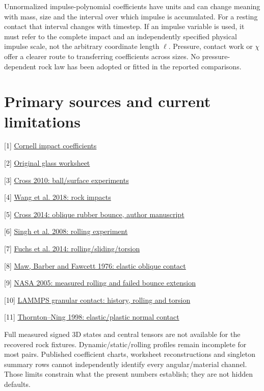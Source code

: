 \documentclass[10pt,a4paper]{article}
\begin{document}
Unnormalized impulse-polynomial coefficients have units and can change meaning
with mass, size and the interval over which impulse is accumulated. For a resting
contact that interval changes with timestep. If an impulse variable is used, it must
refer to the complete impact and an independently specified physical impulse scale,
not the arbitrary coordinate length $\ell$. Pressure, contact work or $\chi$ offer
a clearer route to transferring coefficients across sizes. No pressure-dependent
rock law has been adopted or fitted in the reported comparisons.

\newpage
\section*{Primary sources and current limitations}
[1] \href{https://grainflowresearch.mae.cornell.edu/impact/data/Impact%20Results.html}{Cornell impact coefficients}

[2] \href{https://grainflowresearch.mae.cornell.edu/impact/data/Results-3mmglass-binary}{Original glass worksheet}

[3] \href{https://www.physics.usyd.edu.au/~cross/PUBLICATIONS/48.%20EnhanceBounce.pdf}{Cross 2010: ball/surface experiments}

[4] \href{https://doi.org/10.5194/nhess-18-3045-2018}{Wang et al. 2018: rock impacts}

[5] \href{https://www.researchgate.net/publication/278104773_Oblique_Bounce_of_a_Rubber_Ball}{Cross 2014: oblique rubber bounce, author manuscript}

[6] \href{https://arxiv.org/abs/0809.4823}{Singh et al. 2008: rolling experiment}

[7] \href{https://www2.msm.ctw.utwente.nl/sluding/PAPERS/2014_WeinhartFuchs_GMr.pdf}{Fuchs et al. 2014: rolling/sliding/torsion}

[8] \href{https://websites.umich.edu/~jbarber/Wear1976.pdf}{Maw, Barber and Fawcett 1976: elastic oblique contact}

[9] \href{https://ntrs.nasa.gov/api/citations/20050217091/downloads/20050217091.pdf}{NASA 2005: measured rolling and failed bounce extension}

[10] \href{https://docs.lammps.org/pair_granular.html}{LAMMPS granular contact: history, rolling and torsion}

[11] \href{https://doi.org/10.1016/S0032-5910(98)00099-0}{Thornton--Ning 1998: elastic/plastic normal contact}

Full measured signed 3D states and central tensors are not available for the
recovered rock fixtures. Dynamic/static/rolling profiles remain incomplete for
most pairs. Published coefficient charts, worksheet reconstructions and singleton
summary rows cannot independently identify every angular/material channel. Those
limits constrain what the present numbers establish; they are not hidden defaults.
\end{document}
